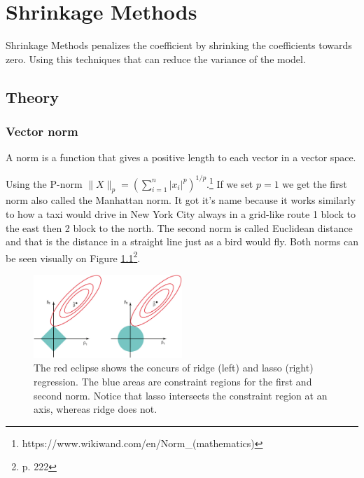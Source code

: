 \chapter{Shrinkage Methods} \label{ch:shrinkageMethods}
Shrinkage Methods penalizes the coefficient by shrinking the coefficients towards zero. Using this techniques that can reduce the variance of the model. 

\section{Theory}
\subsection{Vector norm}
A norm is a function that gives a positive length to each vector in a vector space.

\noindent Using the P-norm $\lVert X \rVert_p = (\sum_{i=1}^{n}|x_i|^p)^{1/p}$.\footnote{https://www.wikiwand.com/en/Norm\_(mathematics)} If we set $ p = 1 $ we get the first norm also called the Manhattan norm. It got it's name because it works similarly to how a taxi would drive in New York City always in a grid-like route 1 block to the east then 2 block to the north. The second norm is called Euclidean distance and that is the distance in a straight line just as a bird would fly. Both norms can be seen visually on Figure \ref{fig:normfirstsecond}\footnote{\cite{James2013} p. 222}.

\begin{figure}[H]
	\centering
	\includegraphics[width=0.5\textwidth]{shrinkageMethods/fig/normsL1_L2.jpg}
	\caption{The red eclipse shows the concurs of ridge (left) and lasso (right) regression. The blue areas are constraint regions for the first and second norm. Notice that lasso intersects the constraint region at an axis, whereas ridge does not.}
	\label{fig:normfirstsecond}
\end{figure}

